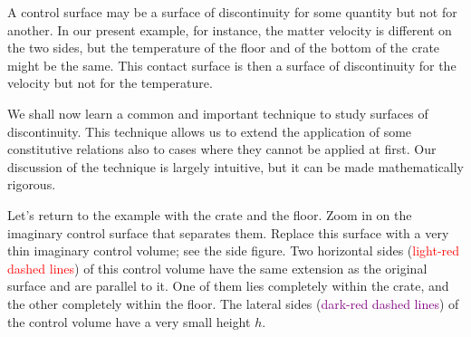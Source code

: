 \documentclass[a4paper,12pt,%
onecolumn,oneside,%
british%
]{memoir}
\renewcommand*{\|}[1][]{\nonscript\:#1\vert\nonscript\:\mathopen{}}
\begin{document}
A control surface may be a surface of discontinuity for some quantity but not for another. In our present example, for instance, the matter velocity is different on the two sides, but the temperature of the floor and of the bottom of the crate might be the same. This contact surface is then a surface of discontinuity for the velocity but not for the temperature.

\medskip

We shall now learn a common and important technique to study surfaces of discontinuity. This technique allows us to extend the application of some constitutive relations also to cases where they cannot be applied at first. Our discussion of the technique is largely intuitive, but it can be made mathematically rigorous.

Let's return to the example with the crate and the floor. Zoom in on the imaginary control surface that separates them. Replace this surface with a very thin imaginary control volume; see the side figure. Two horizontal sides (\textcolor{red}{light-red dashed lines}) of this control volume have the same extension as the original surface and are parallel to it. One of them lies completely within the crate, and the other completely within the floor. The lateral sides (\textcolor{purple}{dark-red dashed lines}) of the control volume have a very small height $h$.
%
%
\end{document}
